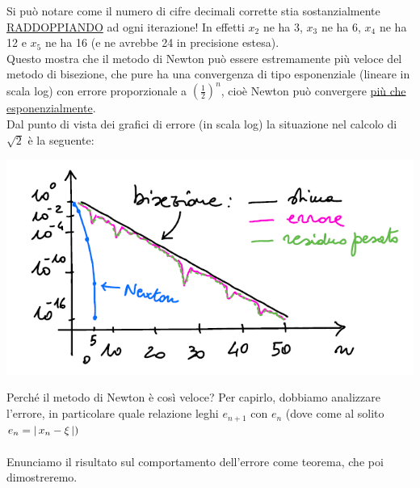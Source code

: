 Si può notare come il numero di cifre decimali corrette stia sostanzialmente \uline{RADDOPPIANDO} ad ogni iterazione! In effetti $x_2$ ne ha 3, $x_3$ ne ha 6, $x_4$ ne ha 12 e $x_5$ ne ha 16 (e ne avrebbe 24 in precisione estesa).\\
Questo mostra che il metodo di Newton può essere estremamente più veloce del metodo di bisezione, che pure ha una convergenza di tipo esponenziale (lineare in scala log) con errore proporzionale a $\left(\frac{1}{2}\right)^n$, cioè Newton può convergere \uline{più che esponenzialmente}.\\
Dal punto di vista dei grafici di errore (in scala log) la situazione nel calcolo di $\sqrt{2}$ è la seguente:\\
\begin{center}
    \includegraphics{foto/pagina25}
\end{center}
Perché il metodo di Newton è così veloce? Per capirlo, dobbiamo analizzare l'errore, in particolare quale relazione leghi $e_{n+1}$ con $e_n$ (dove come al solito $e_n=\lvert\,x_n-\xi\,\rvert)$\\\\
Enunciamo il risultato sul comportamento dell'errore come teorema, che poi dimostreremo.

